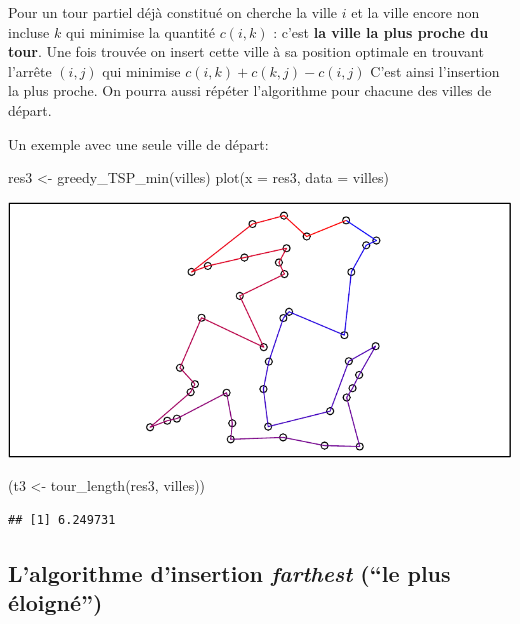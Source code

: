 \documentclass[
]{article}
\newenvironment{Shaded}{\begin{snugshade}}{\end{snugshade}}
\newcommand{\AttributeTok}[1]{\textcolor[rgb]{0.77,0.63,0.00}{#1}}
\newcommand{\FunctionTok}[1]{\textcolor[rgb]{0.00,0.00,0.00}{#1}}
\newcommand{\NormalTok}[1]{#1}
\newcommand{\OtherTok}[1]{\textcolor[rgb]{0.56,0.35,0.01}{#1}}
\begin{document}
Pour un tour partiel déjà constitué on cherche la ville \(i\) et la
ville encore non incluse \(k\) qui minimise la quantité \(c(i,k)\) :
c'est \textbf{la ville la plus proche du tour}. Une fois trouvée on
insert cette ville à sa position optimale en trouvant l'arrête \((i,j)\)
qui minimise \(c(i,k) + c(k,j) - c(i,j)\) C'est ainsi l'insertion la
plus proche. On pourra aussi répéter l'algorithme pour chacune des
villes de départ.

Un exemple avec une seule ville de départ:

\begin{Shaded}
\begin{Highlighting}[]
\NormalTok{res3 }\OtherTok{\textless{}{-}} \FunctionTok{greedy\_TSP\_min}\NormalTok{(villes)}
\FunctionTok{plot}\NormalTok{(}\AttributeTok{x =}\NormalTok{ res3, }\AttributeTok{data =}\NormalTok{ villes)}
\end{Highlighting}
\end{Shaded}

\includegraphics{rapport_TSP_files/figure-latex/insert nearest-1.pdf}

\begin{Shaded}
\begin{Highlighting}[]
\NormalTok{(t3 }\OtherTok{\textless{}{-}} \FunctionTok{tour\_length}\NormalTok{(res3, villes))}
\end{Highlighting}
\end{Shaded}

\begin{verbatim}
## [1] 6.249731
\end{verbatim}

\hypertarget{lalgorithme-dinsertion-farthest-le-plus-uxe9loignuxe9}{%
\subsection{\texorpdfstring{L'algorithme d'insertion \emph{farthest}
(``le plus
éloigné'')}{L'algorithme d'insertion farthest (``le plus éloigné'')}}\label{lalgorithme-dinsertion-farthest-le-plus-uxe9loignuxe9}}
\end{document}
